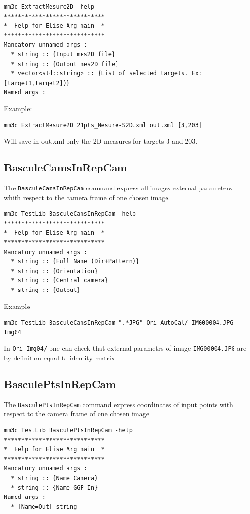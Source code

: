 \begin{verbatim}
mm3d ExtractMesure2D -help
*****************************
*  Help for Elise Arg main  *
*****************************
Mandatory unnamed args : 
  * string :: {Input mes2D file}
  * string :: {Output mes2D file}
  * vector<std::string> :: {List of selected targets. Ex: [target1,target2])}
Named args : 
\end{verbatim}

Example:
\begin{verbatim}
mm3d ExtractMesure2D 21pts_Mesure-S2D.xml out.xml [3,203]
\end{verbatim}
Will save in out.xml only the 2D measures for targets 3 and 203.

\subsection{BasculeCamsInRepCam}
The {\tt BasculeCamsInRepCam} command express all images external parameters whith respect to the camera frame of one chosen image.

\begin{verbatim}
mm3d TestLib BasculeCamsInRepCam -help
*****************************
*  Help for Elise Arg main  *
*****************************
Mandatory unnamed args : 
  * string :: {Full Name (Dir+Pattern)}
  * string :: {Orientation}
  * string :: {Central camera}
  * string :: {Output}
\end{verbatim}

Example :
\begin{verbatim}
mm3d TestLib BasculeCamsInRepCam ".*JPG" Ori-AutoCal/ IMG00004.JPG Img04
\end{verbatim}

In {\tt Ori-Img04/} one can check that external parametrs of image {\tt IMG00004.JPG} are by definition equal to identity matrix.

\subsection{BasculePtsInRepCam}
The {\tt BasculePtsInRepCam} command express coordinates of input points with respect to the camera frame of one chosen image.

\begin{verbatim}
mm3d TestLib BasculePtsInRepCam -help
*****************************
*  Help for Elise Arg main  *
*****************************
Mandatory unnamed args : 
  * string :: {Name Camera}
  * string :: {Name GGP In}
Named args : 
  * [Name=Out] string
\end{verbatim}

